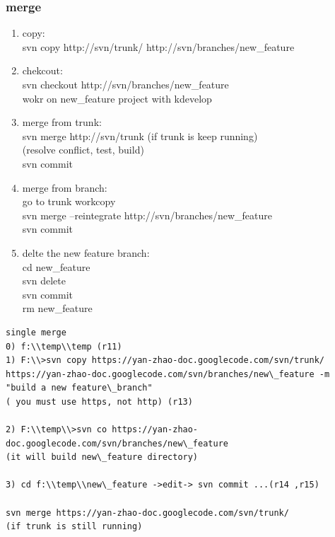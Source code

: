 \documentclass[a4paper,12pt,twoside]{book}
\begin{document}
\begin{CJK*}{UTF8}{song}
\subsubsection{merge}
\begin{enumerate}
 \item copy: \\
svn copy http://svn/trunk/   http://svn/branches/new\_feature
\item chekcout:\\
svn checkout
http://svn/branches/new\_feature \\
wokr on new\_feature project with kdevelop
\item merge from trunk:\\
svn merge http://svn/trunk (if trunk is keep running) \\
 (resolve conflict, test, build) \\
svn commit
\item merge from branch:\\
go to trunk workcopy \\
svn merge  --reintegrate http://svn/branches/new\_feature \\
svn commit
\item delte the new feature branch:\\
cd new\_feature \\
svn delete \\
svn commit \\
rm new\_feature
\end{enumerate}

\begin{verbatim}
single merge
0) f:\\temp\\temp (r11)
1) F:\\>svn copy https://yan-zhao-doc.googlecode.com/svn/trunk/
https://yan-zhao-doc.googlecode.com/svn/branches/new\_feature -m "build a new feature\_branch"
( you must use https, not http) (r13)

2) F:\\temp\\>svn co https://yan-zhao-doc.googlecode.com/svn/branches/new\_feature
(it will build new\_feature directory)

3) cd f:\\temp\\new\_feature ->edit-> svn commit ...(r14 ,r15)

svn merge https://yan-zhao-doc.googlecode.com/svn/trunk/
(if trunk is still running)


\end{verbatim}
\end{CJK*}
\end{document}
